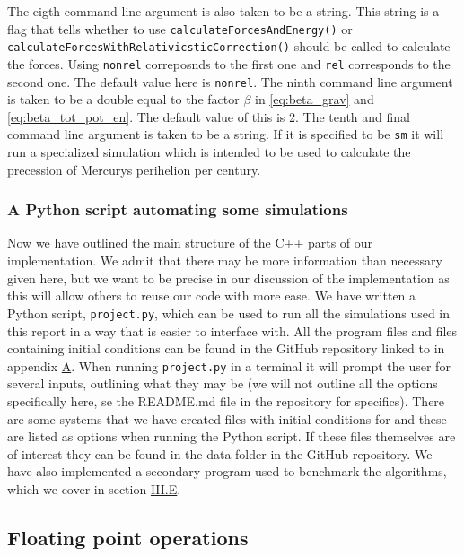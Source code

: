\documentclass[reprint,english,notitlepage]{revtex4-1}  %
\begin{document}
The eigth command line argument is also taken to be a string. This string is a flag that tells whether to use \verb+calculateForcesAndEnergy()+ or \verb+calculateForcesWithRelativicsticCorrection()+ should be called to calculate the forces. Using \verb+nonrel+ correposnds to the first one and \verb+rel+ corresponds to the second one. The default value here is \verb+nonrel+. The ninth command line argument is taken to be a double equal to the factor $\beta$ in \eqref{eq:beta_grav} and \eqref{eq:beta_tot_pot_en}. The default value of this is 2. The tenth and final command line argument is taken to be a string. If it is specified to be \verb+sm+ it will run a specialized simulation which is intended to be used to calculate the precession of Mercurys perihelion per century.


\subsubsection{A Python script automating some simulations} \label{sec:III:a:5}

Now we have outlined the main structure of the C++ parts of our implementation. We admit that there may be more information than necessary given here, but we want to be precise in our discussion of the implementation as this will allow others to reuse our code with more ease. We have written a Python script, \verb+project.py+, which can be used to run all the simulations used in this report in a way that is easier to interface with. All the program files and files containing initial conditions can be found in the GitHub repository linked to in appendix \hyperref[A]{A}. When running \verb+project.py+ in a terminal it will prompt the user for several inputs, outlining what they may be (we will not outline all the options specifically here, se the README.md file in the repository for specifics). There are some systems that we have created files with initial conditions for and these are listed as options when running the Python script. If these files themselves are of interest they can be found in the data folder in the GitHub repository. We have also implemented a secondary program used to benchmark the algorithms, which we cover in section \hyperref[sec:III:e]{III.E}.

\subsection{Floating point operations} \label{sec:III:b}
\end{document}
